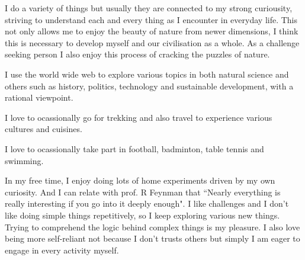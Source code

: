 {}

I do a variety of things but usually they are connected to my strong curiousity, striving to understand each and every thing as I encounter in everyday life. This not only allows me to enjoy the beauty of nature from newer dimensions, I think this is necessary to develop myself and our civilisation as a whole. As a challenge seeking person I also enjoy this process of cracking the puzzles of nature.

I use the world wide web to explore various topics in both natural science and others such as history, politics, technology and sustainable development, with a rational viewpoint.

I love to ocassionally go for trekking and also travel to experience various cultures and cuisines.

I love to ocassionally take part in football, badminton, table tennis and swimming. 

In my free time, I enjoy doing lots of home experiments driven by my own curiosity. And I can relate with prof. R Feynman that ``Nearly everything is really interesting if you go into it deeply enough". 
I like challenges and I don't like doing simple things repetitively, so I keep exploring various new things. Trying to comprehend the logic behind complex things is my pleasure.
I also love being more self-reliant not because I don't trusts others but simply I am eager to engage in every activity myself.




